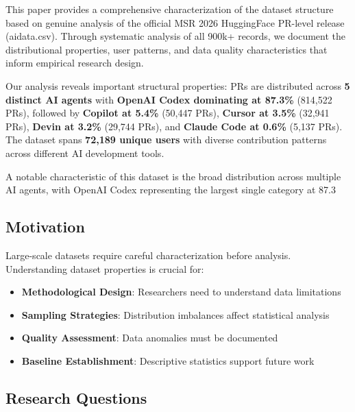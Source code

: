 \documentclass[conference]{IEEEtran}
\begin{document}
This paper provides a comprehensive characterization of the dataset structure based on genuine analysis of the official MSR 2026 HuggingFace PR-level release (aidata.csv). Through systematic analysis of all 900k+ records, we document the distributional properties, user patterns, and data quality characteristics that inform empirical research design.

Our analysis reveals important structural properties: PRs are distributed across \textbf{5 distinct AI agents} with \textbf{OpenAI Codex dominating at 87.3\%} (814,522 PRs), followed by \textbf{Copilot at 5.4\%} (50,447 PRs), \textbf{Cursor at 3.5\%} (32,941 PRs), \textbf{Devin at 3.2\%} (29,744 PRs), and \textbf{Claude Code at 0.6\%} (5,137 PRs). The dataset spans \textbf{72,189 unique users} with diverse contribution patterns across different AI development tools. 

A notable characteristic of this dataset is the broad distribution across multiple AI agents, with OpenAI Codex representing the largest single category at 87.3%

\subsection{Motivation}

Large-scale datasets require careful characterization before analysis. Understanding dataset properties is crucial for:
\begin{itemize}
    \item \textbf{Methodological Design}: Researchers need to understand data limitations
    \item \textbf{Sampling Strategies}: Distribution imbalances affect statistical analysis
    \item \textbf{Quality Assessment}: Data anomalies must be documented
    \item \textbf{Baseline Establishment}: Descriptive statistics support future work
\end{itemize}

\subsection{Research Questions}
\end{document}
